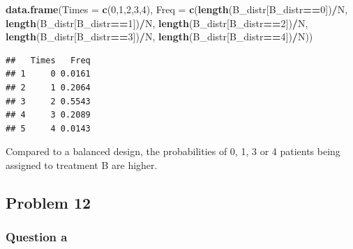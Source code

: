 \documentclass[]{article}
\newenvironment{Shaded}{\begin{snugshade}}{\end{snugshade}}
\newcommand{\DataTypeTok}[1]{\textcolor[rgb]{0.13,0.29,0.53}{#1}}
\newcommand{\DecValTok}[1]{\textcolor[rgb]{0.00,0.00,0.81}{#1}}
\newcommand{\KeywordTok}[1]{\textcolor[rgb]{0.13,0.29,0.53}{\textbf{#1}}}
\newcommand{\NormalTok}[1]{#1}
\newcommand{\OperatorTok}[1]{\textcolor[rgb]{0.81,0.36,0.00}{\textbf{#1}}}
\begin{document}
\begin{Shaded}
\begin{Highlighting}[]
\KeywordTok{data.frame}\NormalTok{(}\DataTypeTok{Times =} \KeywordTok{c}\NormalTok{(}\DecValTok{0}\NormalTok{,}\DecValTok{1}\NormalTok{,}\DecValTok{2}\NormalTok{,}\DecValTok{3}\NormalTok{,}\DecValTok{4}\NormalTok{), }\DataTypeTok{Freq =} \KeywordTok{c}\NormalTok{(}\KeywordTok{length}\NormalTok{(B_distr[B_distr}\OperatorTok{==}\DecValTok{0}\NormalTok{])}\OperatorTok{/}\NormalTok{N, }\KeywordTok{length}\NormalTok{(B_distr[B_distr}\OperatorTok{==}\DecValTok{1}\NormalTok{])}\OperatorTok{/}\NormalTok{N, }\KeywordTok{length}\NormalTok{(B_distr[B_distr}\OperatorTok{==}\DecValTok{2}\NormalTok{])}\OperatorTok{/}\NormalTok{N, }\KeywordTok{length}\NormalTok{(B_distr[B_distr}\OperatorTok{==}\DecValTok{3}\NormalTok{])}\OperatorTok{/}\NormalTok{N, }\KeywordTok{length}\NormalTok{(B_distr[B_distr}\OperatorTok{==}\DecValTok{4}\NormalTok{])}\OperatorTok{/}\NormalTok{N))}
\end{Highlighting}
\end{Shaded}

\begin{verbatim}
##   Times   Freq
## 1     0 0.0161
## 2     1 0.2064
## 3     2 0.5543
## 4     3 0.2089
## 5     4 0.0143
\end{verbatim}

Compared to a balanced design, the probabilities of 0, 1, 3 or 4
patients being assigned to treatment B are higher.

\hypertarget{problem-12}{%
\subsection{Problem 12}\label{problem-12}}

\hypertarget{question-a-7}{%
\subsubsection{Question a}\label{question-a-7}}
\end{document}
